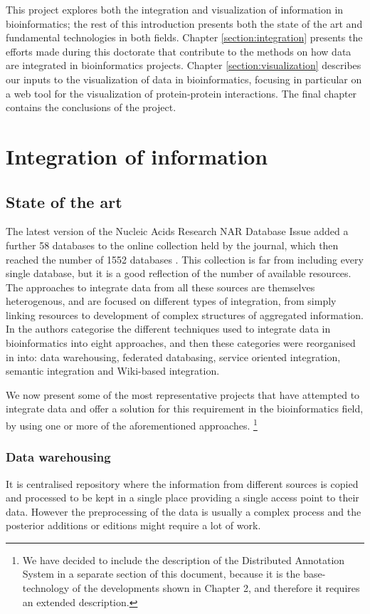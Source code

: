 This project explores both the integration and visualization of information in bioinformatics; the rest of this introduction presents both the state of the art and fundamental technologies in both fields. Chapter \ref{section:integration} presents the efforts made during this doctorate that contribute to the methods on how data are integrated in bioinformatics projects. Chapter \ref{section:visualization} describes our inputs to the visualization of data in bioinformatics, focusing in particular on a web tool for the visualization of protein-protein interactions. The final chapter contains the conclusions of the project.

\section{Integration of information}
\subsection{State of the art}
The latest version of the Nucleic Acids Research NAR Database Issue added a further 58 databases to the online collection held by the journal, which then reached the number of 1552 databases \cite{FER2014}. This collection is far from including every single database, but it is  a good reflection of the number of available resources.
The approaches to integrate data from all these sources are themselves heterogenous, and are focused on different types of integration, from simply linking resources to development of complex structures of aggregated information. In \cite{GOB2008} the authors categorise the different techniques used to integrate data in bioinformatics into eight approaches, and then these categories were reorganised in \cite{ZHA2011b} into: data warehousing, federated databasing, service oriented integration, semantic integration and Wiki-based integration.

We now present some of the most representative projects that have attempted to integrate data and offer a solution for this requirement in the bioinformatics field, by using one or more of the aforementioned approaches. \footnote{We have decided to include the description of the Distributed Annotation System in a separate section of this document, because it is the base-technology of the developments shown in Chapter 2, and therefore it requires an extended description.}

\subsubsection{Data warehousing} 
It is centralised repository where the information from different sources is copied and processed to be kept  in a single place providing a single access point to their data. However the preprocessing of the data is usually a complex process and the posterior additions or editions might require a lot of work.

